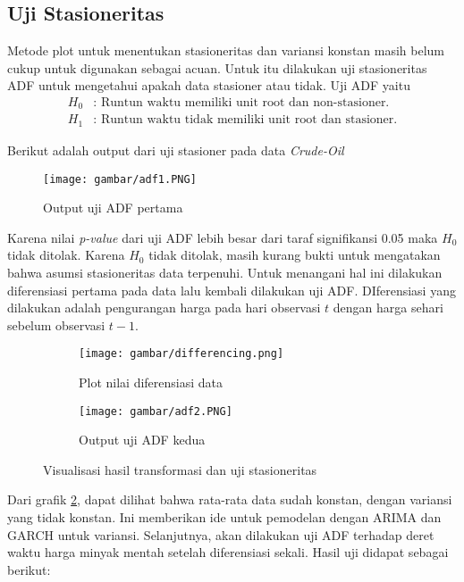 \documentclass[a4paper,12pt]{article}
\begin{document}
\subsection{Uji Stasioneritas}

Metode plot untuk menentukan stasioneritas dan variansi konstan masih belum cukup untuk digunakan sebagai acuan. Untuk itu dilakukan uji stasioneritas ADF untuk mengetahui apakah data stasioner atau tidak. Uji ADF yaitu 
\begin{align*}
    H_0&: \text{ Runtun waktu memiliki unit root dan non-stasioner.}\\
    H_1&: \text{ Runtun waktu tidak memiliki unit root dan stasioner.}
\end{align*}

Berikut adalah output dari uji stasioner pada data \textit{Crude-Oil}\\
\begin{figure}[htb!]
    \centering
    \texttt{[image: gambar/adf1.PNG]}
    \caption{Output uji ADF pertama}
    \label{fig:output adf 1}
\end{figure}

Karena nilai \textit{p-value} dari uji ADF lebih besar dari taraf signifikansi 0.05 maka $H_0 $ tidak ditolak. Karena $H_0$ tidak ditolak, masih kurang bukti untuk mengatakan bahwa asumsi stasioneritas data terpenuhi. Untuk menangani hal ini dilakukan diferensiasi pertama pada data lalu kembali dilakukan uji ADF. DIferensiasi yang dilakukan adalah pengurangan harga pada hari observasi $t$ dengan harga sehari sebelum observasi $t-1$.

\begin{figure}[htb!]
    \centering
    \begin{subfigure}{0.45\textwidth}
        \centering
        \texttt{[image: gambar/differencing.png]}
        \caption{Plot nilai diferensiasi data}
        \label{fig:differencing}
    \end{subfigure}
    \hfill
    \begin{subfigure}{0.45\textwidth}
        \centering
        \texttt{[image: gambar/adf2.PNG]}
        \caption{Output uji ADF kedua}
        \label{fig:output_adf_2}
    \end{subfigure}
    \caption{Visualisasi hasil transformasi dan uji stasioneritas}
    \label{fig:output adf 2}
\end{figure}

Dari grafik \ref{fig:differencing}, dapat dilihat bahwa rata-rata data sudah konstan, dengan variansi yang tidak konstan. Ini memberikan ide untuk pemodelan dengan ARIMA dan GARCH untuk variansi. Selanjutnya, akan dilakukan uji ADF terhadap deret waktu harga minyak mentah setelah diferensiasi sekali. Hasil uji didapat sebagai berikut:
\end{document}
